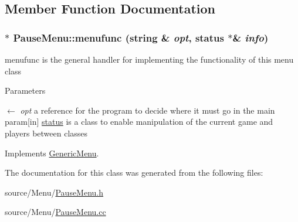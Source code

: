 \subsection{Member Function Documentation}
\hypertarget{classPauseMenu_a7926ffe9dd0aa74281d8cb8126cd9c10}{
\subsubsection[{menufunc}]{ $\ast$ PauseMenu::menufunc (string \& {\em opt}, \/  {\bf status} $\ast$\& {\em info})}}
\label{classPauseMenu_a7926ffe9dd0aa74281d8cb8126cd9c10}


menufunc is the general handler for implementing the functionality of this menu class 
\begin{DoxyParams}{Parameters}
\item[\mbox{$\leftarrow$} {\em opt}]a reference for the program to decide where it must go in the main param\mbox{[}in\mbox{]} \hyperlink{classstatus}{status} is a class to enable manipulation of the current game and players between classes \end{DoxyParams}


Implements \hyperlink{classGenericMenu_a290ad7ec3331edc968190b1d7b48a397}{GenericMenu}.

The documentation for this class was generated from the following files:\begin{DoxyCompactItemize}
\item 
source/Menu/\hyperlink{PauseMenu_8h}{PauseMenu.h}\item 
source/Menu/\hyperlink{PauseMenu_8cc}{PauseMenu.cc}\end{DoxyCompactItemize}

